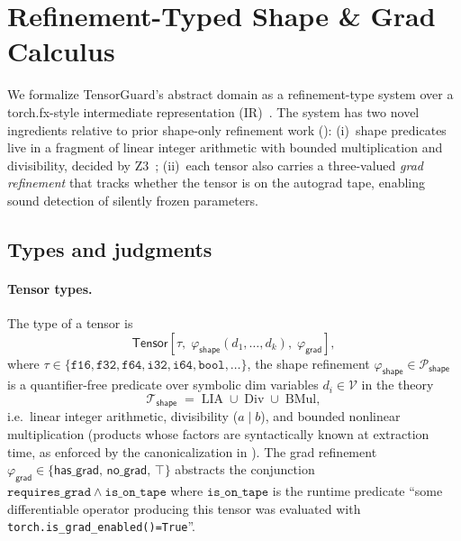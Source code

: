 \section{Refinement-Typed Shape \& Grad Calculus}
\label{sec:refinement-types}

We formalize TensorGuard's abstract domain as a refinement-type
system over a torch.fx-style intermediate representation
(IR)~\cite{reed2022torchfx}. The system has two novel ingredients
relative to prior shape-only refinement work
(): (i)~shape predicates live in a fragment of
linear integer arithmetic with bounded multiplication and
divisibility, decided by Z3~\cite{moura2008z3}; (ii)~each tensor
also carries a three-valued \emph{grad refinement} that tracks
whether the tensor is on the autograd tape, enabling sound
detection of silently frozen parameters.

\subsection{Types and judgments}
\label{sec:rt:types}

\paragraph{Tensor types.} The type of a tensor is
\[
 \mathsf{Tensor}[\tau,\;\varphi_{\mathsf{shape}}(d_1,\dots,d_k),\;\varphi_{\mathsf{grad}}],
\]
where $\tau\in\{\mathtt{f16},\mathtt{f32},\mathtt{f64},\mathtt{i32},\mathtt{i64},\mathtt{bool},\dots\}$,
the shape refinement
$\varphi_{\mathsf{shape}}\in\mathcal{P}_{\mathsf{shape}}$ is a
quantifier-free predicate over symbolic dim variables
$d_i\in\mathcal{V}$ in the theory
\[
 \mathcal{T}_{\mathsf{shape}} \;=\; \mathrm{LIA} \;\cup\;
 \mathrm{Div} \;\cup\; \mathrm{BMul},
\]
i.e.\ linear integer arithmetic, divisibility ($a\mid b$), and
bounded nonlinear multiplication (products whose factors are
syntactically known at extraction time, as enforced by the
canonicalization in
). The grad refinement
\(
 \varphi_{\mathsf{grad}}\in\{\mathsf{has\_grad},\,\mathsf{no\_grad},\,\top\}
\)
abstracts the conjunction
$\mathtt{requires\_grad}\wedge\mathtt{is\_on\_tape}$ where
$\mathtt{is\_on\_tape}$ is the runtime predicate ``some
differentiable operator producing this tensor was evaluated with
\texttt{torch.is\_grad\_enabled()=True}''.


